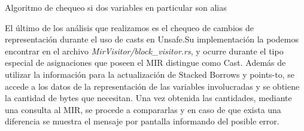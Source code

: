 \begin{algorithm}
    \caption{Algoritmo de chequeo si dos variables en particular son alias}
    \DontPrintSemicolon
\end{algorithm}

El último de los análisis que realizamos es el chequeo de cambios de representación durante el uso de casts en Unsafe.Su implementación la podemos encontrar en el archivo \textit{MirVisitor/block\_visitor.rs}, y ocurre durante el tipo especial de asignaciones que poseen el MIR distingue como Cast. Además de utilizar la información para la actualización de Stacked Borrows y points-to, se accede a los datos de la representación de las variables involucradas y se obtiene la cantidad de bytes que necesitan. Una vez obtenida las cantidades, mediante una consulta al MIR, se procede a compararlas y en caso de que exista una diferencia se muestra el mensaje por pantalla informando del posible error.
